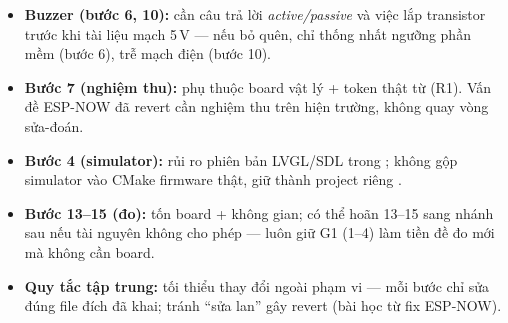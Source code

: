 \begin{itemize}
\item \textbf{Buzzer (bước 6, 10):} cần câu trả lời \emph{active/passive} và việc
lắp transistor trước khi tài liệu mạch 5\,V — nếu bỏ quên, chỉ thống nhất
ngưỡng phần mềm (bước 6), trễ mạch điện (bước 10).
\item \textbf{Bước 7 (nghiệm thu):} phụ thuộc board vật lý + token thật từ
 (R1). Vấn đề ESP-NOW đã revert cần nghiệm thu trên hiện
trường, không quay vòng sửa-đoán.
\item \textbf{Bước 4 (simulator):} rủi ro phiên bản LVGL/SDL trong
; không gộp simulator vào CMake firmware thật, giữ
thành project riêng .
\item \textbf{Bước 13--15 (đo):} tốn board + không gian; có thể hoãn 13--15
sang nhánh sau nếu tài nguyên không cho phép — luôn giữ G1 (1--4) làm tiền đề
đo mới mà không cần board.
\item \textbf{Quy tắc tập trung:} tối thiểu thay đổi ngoài phạm vi — mỗi bước
chỉ sửa đúng file đích đã khai; tránh ``sửa lan'' gây revert (bài học từ fix
ESP-NOW).
\end{itemize}